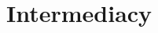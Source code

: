 \documentclass[9pt,twocolumn,twoside]{pnas-alt} %
\theoremstyle{definition}
\begin{document}


%
%

\section*{\label{sec:intermediacy}Intermediacy}
\end{document}
